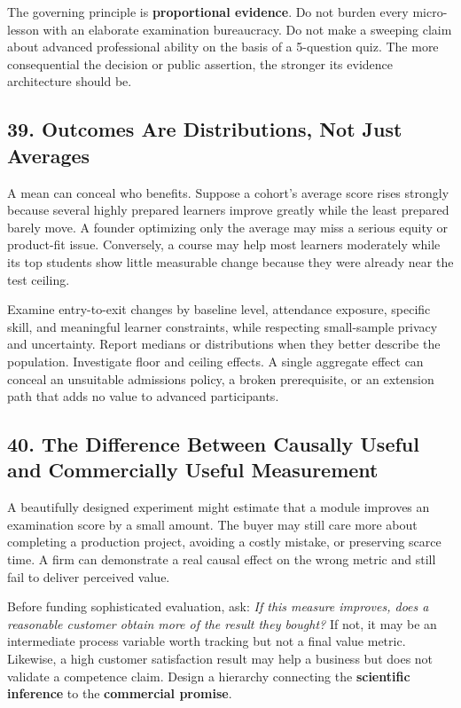 The governing principle is \textbf{proportional evidence}. Do not burden every micro-lesson with an elaborate examination bureaucracy. Do not make a sweeping claim about advanced professional ability on the basis of a 5-question quiz. The more consequential the decision or public assertion, the stronger its evidence architecture should be.

\subsection*{39. Outcomes Are Distributions, Not Just Averages}

A mean can conceal who benefits. Suppose a cohort's average score rises strongly because several highly prepared learners improve greatly while the least prepared barely move. A founder optimizing only the average may miss a serious equity or product-fit issue. Conversely, a course may help most learners moderately while its top students show little measurable change because they were already near the test ceiling.

Examine entry-to-exit changes by baseline level, attendance exposure, specific skill, and meaningful learner constraints, while respecting small-sample privacy and uncertainty. Report medians or distributions when they better describe the population. Investigate floor and ceiling effects. A single aggregate effect can conceal an unsuitable admissions policy, a broken prerequisite, or an extension path that adds no value to advanced participants.

\subsection*{40. The Difference Between Causally Useful and Commercially Useful Measurement}

A beautifully designed experiment might estimate that a module improves an examination score by a small amount. The buyer may still care more about completing a production project, avoiding a costly mistake, or preserving scarce time. A firm can demonstrate a real causal effect on the wrong metric and still fail to deliver perceived value.

Before funding sophisticated evaluation, ask: \emph{If this measure improves, does a reasonable customer obtain more of the result they bought?} If not, it may be an intermediate process variable worth tracking but not a final value metric. Likewise, a high customer satisfaction result may help a business but does not validate a competence claim. Design a hierarchy connecting the \textbf{scientific inference} to the \textbf{commercial promise}.
